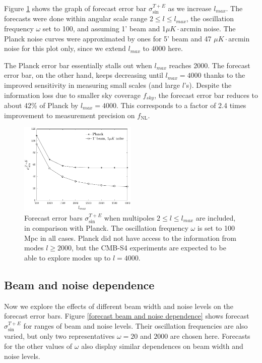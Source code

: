 Figure \ref{forecast lmax dependence} shows the graph of forecast error bar $\sigma_{\sin}^{T+E}$ as we increase $l_{max}$. The forecasts were done within angular scale range $2\le l \le l_{max}$, the oscillation frequency $\omega$ set to 100, and assuming 1' beam and 1$\mu K\cdot$arcmin noise. The Planck noise curves were approximated by ones for 5' beam and 47 $\mu K\cdot$arcmin noise for this plot only, since we extend $l_{max}$ to 4000 here. 

The Planck error bar essentially stalls out when $l_{max}$ reaches 2000. The forecast error bar, on the other hand, keeps decreasing until $l_{max}=4000$ thanks to the improved sensitivity in measuring small scales (and large $l$'s). Despite the information loss due to smaller sky coverage $f_{sky}$, the forecast error bar reduces to about 42\% of Planck by $l_{max}=4000$. This corresponds to a factor of 2.4 times improvement to measurement precision on $f_\text{NL}$.

\begin{figure}[ht]
	\centering
	\includegraphics[width=0.5\textwidth]{lmax_dependence.pdf}
	\caption{Forecast error bars $\sigma_{\sin}^{T+E}$ when multipoles $2\le l \le l_{max}$ are included, in comparison with Planck. The oscillation frequency $\omega$ is set to 100 Mpc in all cases. Planck did not have access to the information from modes $l\ge 2000$, but the CMB-S4 experiments are expected to be able to explore modes up to $l=4000$.}
	\label{forecast lmax dependence}
\end{figure}

\subsection{Beam and noise dependence}

Now we explore the effects of different beam width and noise levels on the forecast error bars. Figure \ref{forecast beam and noise dependence} shows forecast $\sigma_{\sin}^{T+E}$ for ranges of beam and noise levels. Their oscillation frequencies are also varied, but only two representatives $\omega=20$ and $2000$ are chosen here. Forecasts for the other values of $\omega$ also display similar dependences on beam width and noise levels.

